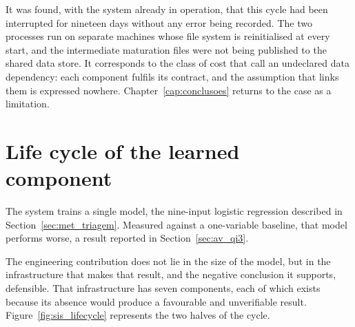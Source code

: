 It was found, with the system already in operation, that this cycle had been interrupted for
nineteen days without any error being recorded. The two processes run on separate machines whose
file system is reinitialised at every start, and the intermediate maturation files were not being
published to the shared data store. It corresponds to the class of cost that
\textcite{sculley2015debt} call an undeclared data dependency: each component fulfils its contract,
and the assumption that links them is expressed nowhere. Chapter~\ref{cap:conclusoes} returns to
the case as a limitation.

\section{Life cycle of the learned component}
\label{sec:sis_ciclo}

The system trains a single model, the nine-input logistic regression described in
Section~\ref{sec:met_triagem}. Measured against a one-variable baseline, that model performs worse,
a result reported in Section~\ref{sec:av_qi3}.

The engineering contribution does not lie in the size of the model, but in the infrastructure that
makes that result, and the negative conclusion it supports, defensible. That infrastructure has
seven components, each of which exists because its absence would produce a favourable and
unverifiable result. Figure~\ref{fig:sis_lifecycle} represents the two halves of the cycle.

